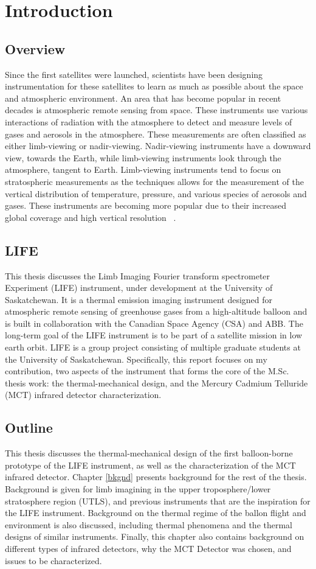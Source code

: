 \chapter{Introduction}

\section{Overview}
Since the first satellites were launched, scientists have been designing instrumentation for these satellites to learn as much as possible about the space and atmospheric environment. An area that has become popular in recent decades is atmospheric remote sensing from space. These instruments use various interactions of radiation with the atmosphere to detect and measure levels of gases and aerosols in the atmosphere. These measurements are often classified as either limb-viewing or nadir-viewing. Nadir-viewing instruments have a downward view, towards the Earth, while limb-viewing instruments look through the atmosphere, tangent to Earth. Limb-viewing instruments tend to focus on stratospheric measurements as the techniques allows for the measurement of the vertical distribution of temperature, pressure, and various species of aerosols and gases. These instruments are becoming more popular due to their increased global coverage and high vertical resolution ~\cite{SPARC}.

\section{LIFE}
This thesis discusses the Limb Imaging Fourier transform spectrometer Experiment (LIFE) instrument, under development at the University of Saskatchewan. It is a thermal emission imaging instrument designed for atmospheric remote sensing of greenhouse gases from a high-altitude balloon and is built in collaboration with the Canadian Space Agency (CSA) and ABB. The long-term goal of the LIFE instrument is to be part of a satellite mission in low earth orbit. LIFE is a group project consisting of multiple graduate students at the University of Saskatchewan. Specifically, this report focuses on my contribution, two aspects of the instrument that forms the core of the M.Sc. thesis work: the thermal-mechanical design, and the Mercury Cadmium Telluride (MCT) infrared detector characterization. 

\section{Outline}
This thesis discusses the thermal-mechanical design of the first balloon-borne prototype of the LIFE instrument, as well as the characterization of the MCT infrared detector. Chapter \ref{bkgnd} presents background for the rest of the thesis. Background is given for limb imagining in the upper troposphere/lower stratosphere region (UTLS), and previous instruments that are the inspiration for the LIFE instrument. Background on the thermal regime of the ballon flight and environment is also discussed, including thermal phenomena and the thermal designs of similar instruments. Finally, this chapter also contains background on different types of infrared detectors, why the MCT Detector was chosen, and issues to be characterized.

